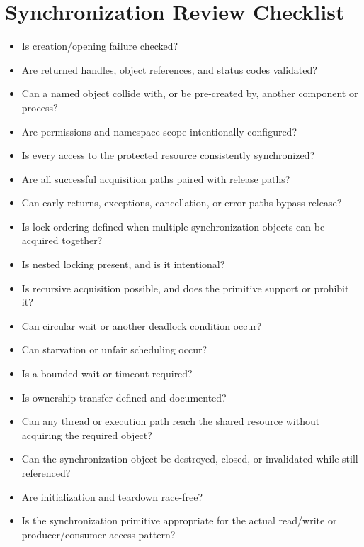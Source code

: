 \documentclass[11pt]{article}
\begin{document}
\section{Synchronization Review Checklist}

\begin{tcolorbox}[breakable,colback=white,colframe=ScoreBlue,title={Reviewer Checklist},fonttitle=\bfseries]
\begin{itemize}
  \item[$\square$] Is creation/opening failure checked?
  \item[$\square$] Are returned handles, object references, and status codes validated?
  \item[$\square$] Can a named object collide with, or be pre-created by, another component or process?
  \item[$\square$] Are permissions and namespace scope intentionally configured?
  \item[$\square$] Is every access to the protected resource consistently synchronized?
  \item[$\square$] Are all successful acquisition paths paired with release paths?
  \item[$\square$] Can early returns, exceptions, cancellation, or error paths bypass release?
  \item[$\square$] Is lock ordering defined when multiple synchronization objects can be acquired together?
  \item[$\square$] Is nested locking present, and is it intentional?
  \item[$\square$] Is recursive acquisition possible, and does the primitive support or prohibit it?
  \item[$\square$] Can circular wait or another deadlock condition occur?
  \item[$\square$] Can starvation or unfair scheduling occur?
  \item[$\square$] Is a bounded wait or timeout required?
  \item[$\square$] Is ownership transfer defined and documented?
  \item[$\square$] Can any thread or execution path reach the shared resource without acquiring the required object?
  \item[$\square$] Can the synchronization object be destroyed, closed, or invalidated while still referenced?
  \item[$\square$] Are initialization and teardown race-free?
  \item[$\square$] Is the synchronization primitive appropriate for the actual read/write or producer/consumer access pattern?
\end{itemize}
\end{tcolorbox}
\end{document}
